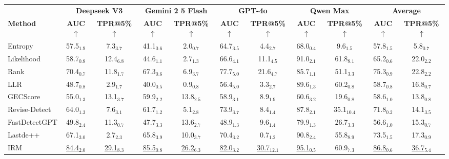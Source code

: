 \begin{tabular}{lcccccccccc}
\toprule
 & \multicolumn{2}{c}{\textbf{Deepseek V3}} & \multicolumn{2}{c}{\textbf{Gemini 2 5 Flash}} & \multicolumn{2}{c}{\textbf{GPT-4o}} & \multicolumn{2}{c}{\textbf{Qwen Max}} & \multicolumn{2}{c}{\textbf{Average}}\\
\cmidrule(lr){2-3} \cmidrule(lr){4-5} \cmidrule(lr){6-7} \cmidrule(lr){8-9}
\textbf{Method} & \textbf{AUC $\uparrow$} & \textbf{TPR@5\% $\uparrow$} & \textbf{AUC $\uparrow$} & \textbf{TPR@5\% $\uparrow$} & \textbf{AUC $\uparrow$} & \textbf{TPR@5\% $\uparrow$} & \textbf{AUC $\uparrow$} & \textbf{TPR@5\% $\uparrow$} & \textbf{AUC $\uparrow$} & \textbf{TPR@5\% $\uparrow$} \\
\midrule
Entropy & 57.5$_{1.9}$ & 7.3$_{3.7}$ & 41.1$_{0.6}$ & 2.0$_{0.7}$ & 64.7$_{3.5}$ & 4.4$_{2.7}$ & 68.0$_{0.4}$ & 9.6$_{1.5}$ & 57.8$_{1.5}$ & 5.8$_{0.7}$ \\
Likelihood & 58.7$_{0.8}$ & 12.4$_{6.8}$ & 44.6$_{1.1}$ & 2.7$_{1.3}$ & 66.6$_{4.1}$ & 11.1$_{4.5}$ & 91.0$_{2.1}$ & 61.8$_{8.1}$ & 65.2$_{0.6}$ & 22.0$_{2.2}$ \\
Rank & 70.4$_{0.7}$ & 11.8$_{1.7}$ & 67.3$_{0.6}$ & 6.9$_{3.7}$ & 77.7$_{5.0}$ & 21.6$_{4.7}$ & 85.7$_{1.1}$ & 51.1$_{3.3}$ & 75.3$_{0.9}$ & 22.8$_{2.2}$ \\
LLR & 48.7$_{0.8}$ & 2.9$_{1.7}$ & 40.0$_{0.5}$ & 0.9$_{0.8}$ & 56.4$_{5.0}$ & 3.3$_{2.7}$ & 89.6$_{1.3}$ & 60.2$_{0.8}$ & 58.7$_{0.8}$ & 16.8$_{0.7}$ \\
GECScore & 55.0$_{1.3}$ & 13.1$_{3.7}$ & 59.9$_{2.2}$ & 13.8$_{2.5}$ & 58.9$_{3.1}$ & 8.9$_{1.9}$ & 60.6$_{3.2}$ & 19.6$_{0.8}$ & 58.6$_{1.0}$ & 13.8$_{0.8}$ \\
Revise-Detect & 64.0$_{1.3}$ & 7.6$_{3.1}$ & 61.7$_{1.2}$ & 5.1$_{2.8}$ & 73.9$_{3.7}$ & 8.4$_{1.4}$ & 87.8$_{2.1}$ & 35.1$_{10.4}$ & 71.8$_{0.2}$ & 14.1$_{3.5}$ \\
FastDetectGPT & 49.8$_{2.4}$ & 11.3$_{0.7}$ & 47.7$_{3.3}$ & 13.6$_{2.7}$ & 48.9$_{1.3}$ & 9.6$_{1.4}$ & 79.9$_{1.3}$ & 26.7$_{3.3}$ & 56.6$_{1.0}$ & 15.3$_{0.7}$ \\
Lastde++ & 67.1$_{3.0}$ & 2.7$_{2.3}$ & 65.8$_{3.9}$ & 10.0$_{3.7}$ & 70.4$_{3.2}$ & 0.7$_{1.2}$ & 90.8$_{2.4}$ & 55.8$_{8.9}$ & 73.5$_{1.5}$ & 17.3$_{0.9}$ \\
IRM & \cellcolor{orange!25}\underline{84.4$_{2.0}$} & \cellcolor{orange!25}\underline{29.1$_{8.3}$} & \cellcolor{orange!25}\underline{85.5$_{0.8}$} & \cellcolor{orange!25}\underline{26.2$_{6.3}$} & \cellcolor{orange!25}\underline{82.0$_{3.2}$} & \cellcolor{orange!25}\underline{30.7$_{12.1}$} & \cellcolor{orange!25}\underline{95.1$_{0.5}$} & 60.9$_{7.3}$ & \cellcolor{orange!25}\underline{86.8$_{0.6}$} & \cellcolor{orange!25}\underline{36.7$_{5.4}$} \\

\end{tabular}
